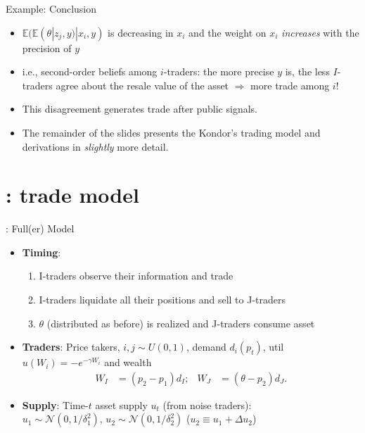 \documentclass[english,10pt
,aspectratio=169
]{beamer}
\begin{document}
\begin{frame}{Example: Conclusion}
	\begin{itemize}
		\item $\mathbb{E}(\mathbb{E}(\theta|z_j,y)|x_i,y)$ is \alert{decreasing in $x_i$} and the weight on $x_i$ \emph{increases} with the precision of $y$
		\item i.e., second-order beliefs  among $i$-traders: the more precise $y$ is, the less $I$-traders agree about the resale value of the asset $\Rightarrow$ more trade among $i$!
		\item This disagreement generates trade after public signals.
		\item The remainder of the slides presents the Kondor's trading model and derivations in \emph{slightly} more detail.
	\end{itemize}
\end{frame}



\section{\cite{kondor_more_2012}: trade model}


\begin{frame}{\cite{kondor_more_2012}: Full(er) Model}
	\begin{itemize}
		\item \textbf{Timing}: 
		\begin{enumerate}
			\item I-traders observe their information and trade
			\item I-traders liquidate all their positions and sell to J-traders
			\item $\theta$ (distributed as before) is realized and J-traders consume asset
		\end{enumerate}
		\item \textbf{Traders}: Price takers, $i, j \sim U(0,1)$, demand $d_i(p_t)$, util $u(W_i)=-e^{-\gamma W_i}$ and  wealth 
		\begin{align*}
			W_I & = (p_2-p_1){d_I}; &
			W_J & = (\theta-p_2){d_J}.
		\end{align*}
		\item \textbf{Supply}: Time-$t$ asset supply  $u_t$ (from noise traders): \\$u_1 \sim \mathcal{N}(0,1/\delta^2_1)$, $u_2\sim \mathcal{N}(0,1/\delta^2_2)$ ($u_2 \equiv u_1 + \varDelta u_2$)
	\end{itemize}
\end{frame}
\end{document}
